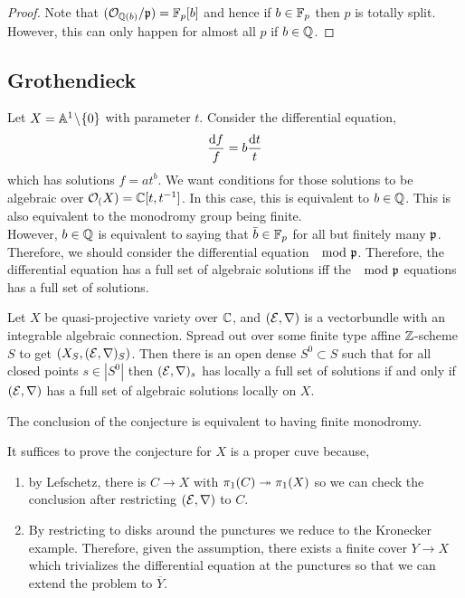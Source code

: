 \documentclass[12pt]{article}
\begin{document}
\begin{proof}
Note that $(\mathcal{O}_{\mathbb{Q}(b)} / \mathfrak{p}) = \mathbb{F}_p[b]$ and hence if $b \in \mathbb{F}_p$ then $p$ is totally split. However, this can only happen for almost all $p$ if $b \in \mathbb{Q}$.
\end{proof}

\subsection{Grothendieck}

Let $X = \mathbb{A}^1 \! \setminus \! \{ 0 \}$ with parameter $t$. Consider the differential equation,
\[ \frac{\mathrm{d}{f}}{f} = b \frac{\mathrm{d}{t}}{t} \]
which has solutions $f = a t^b$. We want conditions for those solutions to be algebraic over $\mathcal{O}_{(}X) = \mathbb{C}[t, t^{-1}]$. In this case, this is equivalent to $b \in \mathbb{Q}$. This is also equivalent to the monodromy group being finite. 
\bigskip\\
However, $b \in \mathbb{Q}$ is equivalent to saying that $\bar{b} \in \mathbb{F}_p$ for all but finitely many $\mathfrak{p}$. Therefore, we should consider the differential equation $\mod {\mathfrak{p}}$. Therefore, the differential equation has a full set of algebraic solutions iff the $\mod {\mathfrak{p}}$ equations has a full set of solutions. 

\begin{conj}[Grothendieck]
Let $X$ be quasi-projective variety over $\mathbb{C}$, and $(\mathcal{E}, \nabla)$ is a vectorbundle with an integrable algebraic connection. Spread out over some finite type affine $\mathbb{Z}$-scheme $S$ to get $(X_S, (\mathcal{E}, \nabla)_S)$. Then there is an open dense $S^0 \subset S$ such that for all closed points $s \in |S^0|$ then $(\mathcal{E}, \nabla)_{s}$ has locally a full set of solutions if and only if $(\mathcal{E}, \nabla)$ has a full set of algebraic solutions locally on $X$. 
\end{conj}

\begin{rmk}
The conclusion of the conjecture is equivalent to having finite monodromy. 
\end{rmk}

\begin{rmk}
It suffices to prove the conjecture for $X$ is a proper cuve because,
\begin{enumerate}
\item by Lefschetz, there is $C \to X$ with $\pi_1(C) \twoheadrightarrow \pi_1(X)$ so we can check the conclusion after restricting $(\mathcal{E}, \nabla)$ to $C$.
\item By restricting to disks around the punctures we reduce to the Kronecker example. Therefore, given the assumption, there exists a finite \etale cover $Y \to X$ which trivializes the differential equation at the punctures so that we can extend the problem to $\overline{Y}$.
\end{enumerate}
\end{rmk}
\end{document}
